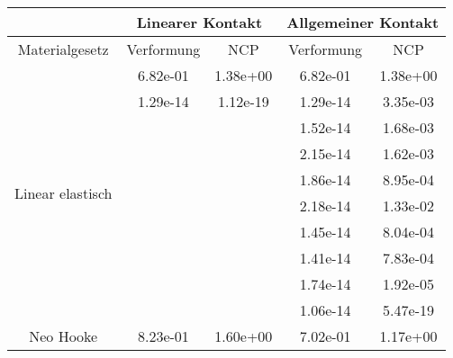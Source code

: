 \begin{table} 
\centering 
\begin{tabular}{c|cc|cc|} 
\cline{2-5} 
 & \multicolumn{2}{|c|}{Linearer Kontakt} & \multicolumn{2}{|c|}{Allgemeiner Kontakt} \\ 
\hline 
\multicolumn{1}{|c|}{Materialgesetz} & \multicolumn{1}{c|}{Verformung} & \multicolumn{1}{c|}{NCP} & \multicolumn{1}{c|}{Verformung} & \multicolumn{1}{c|}{NCP} \\ 
\hline 
\multicolumn{1}{|c|}{\multirow{10}{*}{Linear elastisch}} &\multicolumn{1}{|c|}{  6.82e-01} & \multicolumn{1}{|c|}{  1.38e+00} & \multicolumn{1}{|c|}{  6.82e-01} & \multicolumn{1}{|c|}{  1.38e+00} \\ 
\multicolumn{1}{|c|}{} & \multicolumn{1}{|c|}{  1.29e-14} & \multicolumn{1}{|c|}{  1.12e-19} & \multicolumn{1}{|c|}{  1.29e-14} & \multicolumn{1}{|c|}{  3.35e-03} \\ 
\multicolumn{1}{|c|}{} & \multicolumn{1}{|c|}{} & \multicolumn{1}{|c|}{} & \multicolumn{1}{|c|}{  1.52e-14} & \multicolumn{1}{|c|}{  1.68e-03} \\ 
\multicolumn{1}{|c|}{} & \multicolumn{1}{|c|}{} & \multicolumn{1}{|c|}{} & \multicolumn{1}{|c|}{  2.15e-14} & \multicolumn{1}{|c|}{  1.62e-03} \\ 
\multicolumn{1}{|c|}{} & \multicolumn{1}{|c|}{} & \multicolumn{1}{|c|}{} & \multicolumn{1}{|c|}{  1.86e-14} & \multicolumn{1}{|c|}{  8.95e-04} \\ 
\multicolumn{1}{|c|}{} & \multicolumn{1}{|c|}{} & \multicolumn{1}{|c|}{} & \multicolumn{1}{|c|}{  2.18e-14} & \multicolumn{1}{|c|}{  1.33e-02} \\ 
\multicolumn{1}{|c|}{} & \multicolumn{1}{|c|}{} & \multicolumn{1}{|c|}{} & \multicolumn{1}{|c|}{  1.45e-14} & \multicolumn{1}{|c|}{  8.04e-04} \\ 
\multicolumn{1}{|c|}{} & \multicolumn{1}{|c|}{} & \multicolumn{1}{|c|}{} & \multicolumn{1}{|c|}{  1.41e-14} & \multicolumn{1}{|c|}{  7.83e-04} \\ 
\multicolumn{1}{|c|}{} & \multicolumn{1}{|c|}{} & \multicolumn{1}{|c|}{} & \multicolumn{1}{|c|}{  1.74e-14} & \multicolumn{1}{|c|}{  1.92e-05} \\ 
\multicolumn{1}{|c|}{} & \multicolumn{1}{|c|}{} & \multicolumn{1}{|c|}{} & \multicolumn{1}{|c|}{  1.06e-14} & \multicolumn{1}{|c|}{  5.47e-19} \\ 
\hline 
\multicolumn{1}{|c|}{\multirow{9}{*}{Neo Hooke}} &\multicolumn{1}{|c|}{  8.23e-01} & \multicolumn{1}{|c|}{  1.60e+00} & \multicolumn{1}{|c|}{  7.02e-01} & \multicolumn{1}{|c|}{  1.17e+00} \\ 

\end{tabular}
\end{table}
